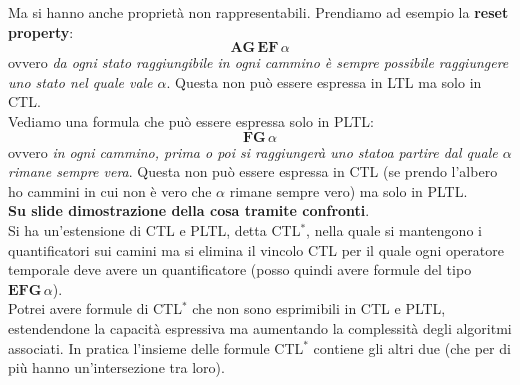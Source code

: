 \documentclass[a4paper,12pt, oneside]{book}
\begin{document}
Ma si hanno anche proprietà non rappresentabili. Prendiamo ad esempio la
\textbf{reset property}:
\[\mathbf{AG}\,\mathbf{EF}\,\alpha\]
ovvero \textit{da ogni stato raggiungibile in ogni cammino è sempre possibile
  raggiungere uno stato nel quale vale $\alpha$}. Questa non può essere espressa
in LTL ma solo in CTL.\\
Vediamo una formula che può essere espressa solo in PLTL:
\[\mathbf{FG}\,\alpha\]
ovvero \textit{in ogni cammino, prima o poi si raggiungerà uno statoa partire
  dal quale $\alpha$ rimane sempre vera}. Questa non può essere espressa
in CTL (se prendo l'albero ho cammini in cui non è vero che $\alpha$ rimane
sempre vero) ma solo in PLTL.\\
\textbf{Su slide dimostrazione della cosa tramite confronti}.\\
Si ha un'estensione di CTL e PLTL, detta CTL$^*$, nella quale si mantengono i
quantificatori sui camini ma si elimina il vincolo CTL per il quale ogni
operatore temporale deve avere un quantificatore (posso quindi avere formule del
tipo $\mathbf{EFG}\,\alpha$).\\ 
Potrei avere formule di CTL$^*$ che non sono esprimibili in CTL e
PLTL, estendendone la capacità espressiva ma aumentando la complessità degli
algoritmi associati. In pratica l'insieme delle formule CTL$^*$ contiene gli
altri due (che per di più hanno un'intersezione tra loro).
\end{document}
